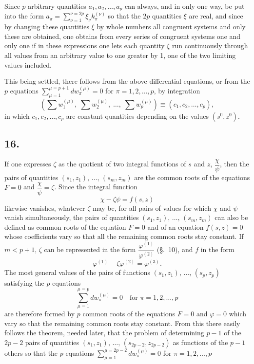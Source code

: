 \documentclass{article}
\begin{document}
Since $p$ arbitrary quantities $a_{1}, a_{2}, \ldots, a_{p}$ can always, and in only one way, be put into the form $a_{\pi} = \displaystyle\sum_{\nu=1}^{\nu=2p} \xi_{\nu} k_{\pi}^{(\nu)}$ so that the $2p$ quantities $\xi$ are real, and since by changing these quantities $\xi$ by whole numbers all congruent systems and only these are obtained, one obtains from every series of congruent systems one and only one if in these expressions one lets each quantity $\xi$ run continuously through all values from an arbitrary value to one greater by 1, one of the two limiting values included.

This being settled, there follows from the above differential equations, or from the $p$ equations $\displaystyle\sum_{\mu=1}^{\mu=p+1} dw_{\pi}^{(\mu)} = 0$ for $\pi = 1, 2, \ldots, p$, by integration
\[ \left(\sum w_{1}^{(\mu)}, \; \sum w_{2}^{(\mu)}, \; \ldots, \; \sum w_{p}^{(\mu)}\right) \equiv (c_{1}, c_{2}, \ldots, c_{p}), \]
in which $c_{1}, c_{2}, \ldots, c_{p}$ are constant quantities depending on the values $(s^{0}, z^{0})$.

\subsection*{16.}

If one expresses $\zeta$ as the quotient of two integral functions of $s$ and $z$, $\dfrac{\chi}{\psi}$, then the pairs of quantities $(s_{1}, z_{1})$, $\ldots$, $(s_{m}, z_{m})$ are the common roots of the equations $F = 0$ and $\dfrac{\chi}{\psi} = \zeta$. Since the integral function
\[ \chi - \zeta\psi = f(s, z) \]
likewise vanishes, whatever $\zeta$ may be, for all pairs of values for which $\chi$ and $\psi$ vanish simultaneously, the pairs of quantities $(s_{1}, z_{1})$, $\ldots$, $(s_{m}, z_{m})$ can also be defined as common roots of the equation $F = 0$ and of an equation $f(s, z) = 0$ whose coefficients vary so that all the remaining common roots stay constant. If $m < p+1$, $\zeta$ can be represented in the form $\dfrac{\varphi^{(1)}}{\varphi^{(2)}}$ (§.~10), and $f$ in the form
\[ \varphi^{(1)} - \zeta\varphi^{(2)} = \varphi^{(3)}. \]
The most general values of the pairs of functions $(s_{1}, z_{1})$, $\ldots$, $(s_{p}, z_{p})$ satisfying the $p$ equations
\[ \sum_{\mu=1}^{\mu=p} dw_{\pi}^{(\mu)} = 0 \quad \text{for } \pi = 1, 2, \ldots, p \]
are therefore formed by $p$ common roots of the equations $F = 0$ and $\varphi = 0$ which vary so that the remaining common roots stay constant. From this there easily follows the theorem, needed later, that the problem of determining $p-1$ of the $2p-2$ pairs of quantities $(s_{1}, z_{1})$, $\ldots$, $(s_{2p-2}, z_{2p-2})$ as functions of the $p-1$ others so that the $p$ equations $\displaystyle\sum_{\mu=1}^{\mu=2p-2} dw_{\pi}^{(\mu)} = 0$ for $\pi = 1, 2, \ldots, p$
\end{document}
